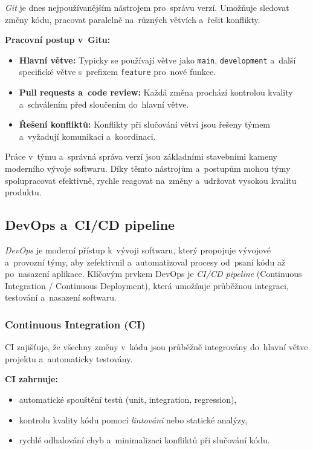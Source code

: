\documentclass[male,czech,api_bc]{kitheses}
\begin{document}
\textit{Git} je dnes nejpoužívanějším nástrojem pro~správu verzí. Umožňuje sledovat změny kódu, pracovat paralelně na~různých větvích a~řešit konflikty.

\textbf{Pracovní postup v~Gitu:}
\begin{itemize}
	\item \textbf{Hlavní větve:} Typicky se používají větve jako \texttt{main}, \texttt{development} a~další specifické větve s~prefixem \texttt{feature} pro~nové funkce.
	\item \textbf{Pull requests a~code review:} Každá změna prochází kontrolou kvality a~schválením před sloučením do~hlavní větve.
	\item \textbf{Řešení konfliktů:} Konflikty při slučování větví jsou řešeny týmem a~vyžadují komunikaci a~koordinaci.
\end{itemize}

Práce v~týmu a~správná správa verzí jsou základními stavebními kameny moderního vývoje softwaru. Díky těmto nástrojům a~postupům mohou týmy spolupracovat efektivně, rychle reagovat na~změny a~udržovat vysokou kvalitu produktu.

\subsection{DevOps a~CI/CD pipeline}

\textit{DevOps} je moderní přístup k~vývoji softwaru, který propojuje vývojové a~provozní týmy, aby zefektivnil a~automatizoval procesy od~psaní kódu až po~nasazení aplikace. Klíčovým prvkem DevOps je \textit{CI/CD pipeline} (Continuous Integration / Continuous Deployment), která umožňuje průběžnou integraci, testování a~nasazení softwaru.

\subsubsection{Continuous Integration (CI)}

CI zajišťuje, že všechny změny v~kódu jsou průběžně integrovány do~hlavní větve projektu a~automaticky testovány.

\textbf{CI zahrnuje:}
\begin{itemize}
	\item automatické spouštění testů (unit, integration, regression),
	\item kontrolu kvality kódu pomocí \textit{lintování} nebo statické analýzy,
	\item rychlé odhalování chyb a~minimalizaci konfliktů při slučování kódu.
\end{itemize}
\end{document}
